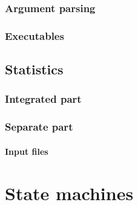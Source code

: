 \documentclass[a4paper, 11pt]{report}
\begin{document}
\subsection{Argument parsing}



\subsection{Executables}



\section{Statistics}
\subsection{Integrated part}



\subsection{Separate part}



\begin{multicols}{2}
\subsubsection{Input files}



\end{multicols}

\restoregeometry

\chapter{State machines} \label{ch:automatons}
\end{document}
